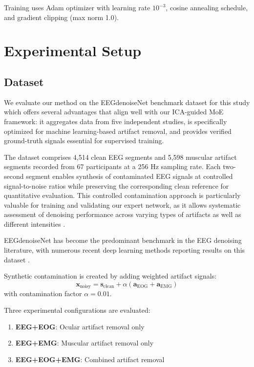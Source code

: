 \documentclass{article}
\begin{document}
Training uses Adam optimizer \cite{kingma2014adam} with learning rate $10^{-3}$, cosine annealing schedule, and gradient clipping (max norm 1.0).

\section{Experimental Setup}
\label{sec:experiments}

\subsection{Dataset}

We evaluate our method on the EEGdenoiseNet benchmark dataset \cite{eegdenoisenet2021} for this study which offers several advantages that align well with our ICA-guided MoE framework: it aggregates data from five independent studies, is specifically optimized for machine learning-based artifact removal, and provides verified ground-truth signals essential for supervised training.

The dataset comprises 4,514 clean EEG segments and 5,598 muscular artifact segments recorded from 67 participants at a 256 Hz sampling rate. Each two-second segment enables synthesis of contaminated EEG signals at controlled signal-to-noise ratios while preserving the corresponding clean reference for quantitative evaluation. This controlled contamination approach is particularly valuable for training and validating our expert network, as it allows systematic assessment of denoising performance across varying types of artifacts as well as different intensities \cite{choi2025moeemg}.

EEGdenoiseNet \cite{eegdenoisenet2021} has become the predominant benchmark in the EEG denoising literature, with numerous recent deep learning methods reporting results on this dataset \cite{choi2025moeemg}. 

Synthetic contamination is created by adding weighted artifact signals:
\begin{equation}
\mathbf{x}_{\text{noisy}} = \mathbf{s}_{\text{clean}} + \alpha (\mathbf{a}_{\text{EOG}} + \mathbf{a}_{\text{EMG}})
\end{equation}
with contamination factor $\alpha = 0.01$.

Three experimental configurations are evaluated:
\begin{enumerate}
\item \textbf{EEG+EOG}: Ocular artifact removal only
\item \textbf{EEG+EMG}: Muscular artifact removal only
\item \textbf{EEG+EOG+EMG}: Combined artifact removal
\end{enumerate}
\end{document}

